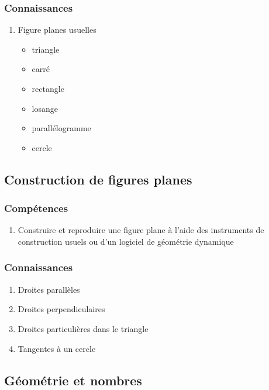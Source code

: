 \documentclass[12pt,a4paper]{article}
\begin{document}
	\subsubsection*{Connaissances}
	\begin{enumerate}
		\item Figure planes usuelles
		\begin{itemize}
			\item triangle
			\item carré
			\item rectangle
			\item losange
			\item parallélogramme
			\item cercle
		\end{itemize}
	\end{enumerate}

\subsection{Construction de figures planes}
	\subsubsection*{Compétences}
	\begin{enumerate}
		\item Construire et reproduire une figure plane à l'aide des instruments de construction usuels ou d'un logiciel de géométrie dynamique
	\end{enumerate}
	
	\subsubsection*{Connaissances}
	\begin{enumerate}
		\item Droites parallèles
		\item Droites perpendiculaires
		\item Droites particulières dans le triangle
		\item Tangentes à un cercle
	\end{enumerate}

\subsection{Géométrie et nombres}
\end{document}
